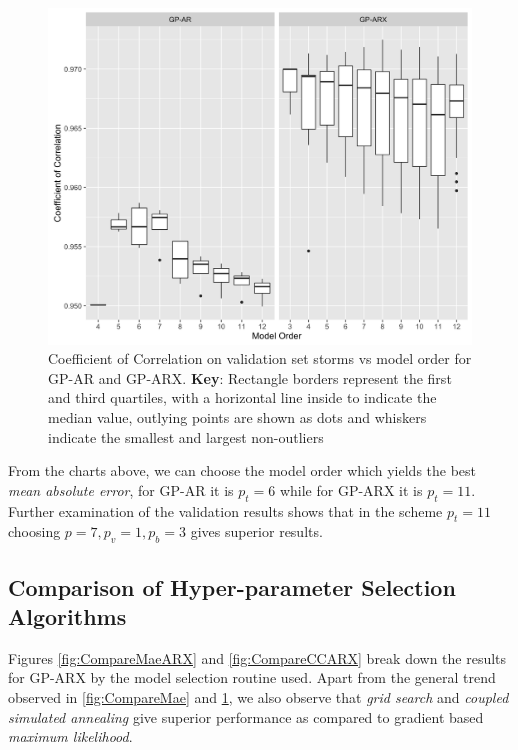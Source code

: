 \documentclass{article}
\begin{document}
\begin{figure}[h]
  \includegraphics[width=\textwidth]{Compare-cc.png}
  \caption{Coefficient of Correlation on validation set storms vs model order for GP-AR and GP-ARX. \textbf{Key}: Rectangle borders represent the first and third quartiles, with a horizontal line inside to indicate the median value, outlying points are shown as dots and whiskers indicate the smallest and largest non-outliers}
  \label{fig:CompareCC}
\end{figure}

From the charts above, we can choose the model order which yields the
best \emph{mean absolute error}, for GP-AR it is $p_t = 6$ while for
GP-ARX it is $p_t = 11$. Further examination of the validation results
shows that in the scheme $p_t = 11$ choosing $p = 7, p_v = 1, p_b = 3$ gives superior results.


\subsection*{Comparison of Hyper-parameter Selection Algorithms}
Figures \ref{fig:CompareMaeARX} and \ref{fig:CompareCCARX} break down the results for GP-ARX by the model selection routine used. Apart from the general trend observed in \ref{fig:CompareMae} and \ref{fig:CompareCC}, we also observe that \emph{grid search} and \emph{coupled simulated annealing} give superior performance as compared to gradient based \emph{maximum likelihood}.
\end{document}
